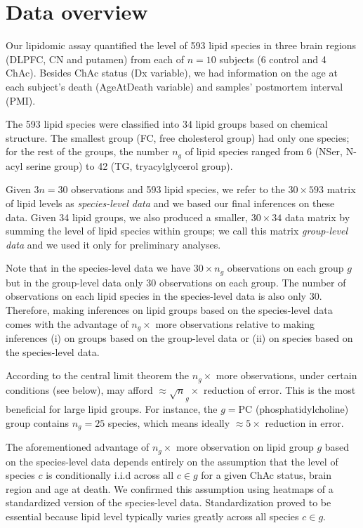 \documentclass[letterpaper]{article}
\begin{document}
\section{Data overview}

Our lipidomic assay quantified the level of 593 lipid species in three brain
regions (DLPFC, CN and putamen) from each of $n=10$ subjects (6 control and 4
ChAc).  Besides ChAc status (Dx variable), we had information on the age at
each subject's death (AgeAtDeath variable) and samples' postmortem interval
(PMI).

The 593 lipid species were classified into 34 lipid groups based on chemical
structure.  The smallest group (FC, free cholesterol group) had only one
species; for the rest of the groups, the number $n_g$ of lipid species ranged
from 6 (NSer, N-acyl serine group) to 42 (TG, tryacylglycerol group).

Given $3n = 30$ observations and 593 lipid species, we refer to the $30 \times
593$ matrix of lipid levels as \emph{species-level data} and we based our
final inferences on these data.  Given 34 lipid groups, we also produced a
smaller, $30 \times 34$ data matrix by summing the level of lipid species
within groups; we call this matrix \emph{group-level data} and we used it only
for preliminary analyses.

Note that in the species-level data we have $30 \times n_g$ observations on
each group $g$ but in the group-level data only $30$ observations on each
group.  The number of observations on each lipid species in the species-level
data is also only $30$.  Therefore, making inferences on lipid groups based on
the species-level data comes with the advantage of $n_g \times$ more
observations relative to making inferences (i) on groups based on the
group-level data or (ii) on species based on the species-level data.

According to the central limit theorem the $n_g \times$ more observations,
under certain conditions (see below), may afford $\approx \sqrt n_g \times$
reduction of error.  This is the most beneficial for large lipid groups.  For
instance, the $g = \mathrm{PC}$ (phosphatidylcholine) group contains $n_g =
25$ species, which means ideally $\approx 5 \times$ reduction in error.

The aforementioned advantage of $n_g \times$
more observation on lipid group $g$ based on the species-level data depends
entirely on the assumption that the level of species $c$ is conditionally
i.i.d across all $c \in g$ for a given ChAc status, brain region and age at
death.  We confirmed this assumption using heatmaps of a standardized  version
of the species-level data.  Standardization proved to be essential because
lipid level typically varies greatly across all species $c \in g$.
\end{document}
